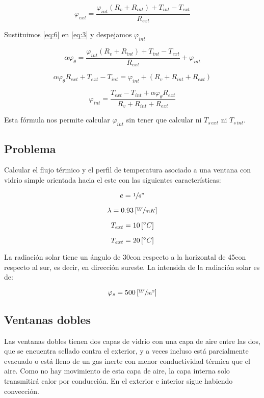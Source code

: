 \documentclass[12pt]{article}
\begin{document}
\begin{equation}\label{eq:6}
    \varphi _{ ext } = \frac{ \varphi _{ int } \left( R_v + R_{ int } \right) + T_{ int } - T_{ ext } }{ R_{ ext } }
\end{equation}

Sustituimos \ref{eq:6} en \ref{eq:3} y despejamos $ \varphi _{ int } $

\[ \alpha \varphi _\theta = \frac{ \varphi _{ int } \left( R_v + R_{ int } \right) + T_{ int } - T_{ ext } }{ R_{ ext } } + \varphi_{ int } \]

\[ \alpha \varphi _ \theta R_{ ext } + T_{ ext } - T_{ int } = \varphi _{ int } + \left( R_v + R_{ int } + R_{ ext } \right) \]

\[  \boxed{ \varphi _{ int } = \frac{ T_{ ext } - T_{ int } + \alpha \varphi _\theta R_{ ext } }{ R_v + R_{ int } + R_{ ext } } } \]

Esta fórmula nos permite calcular $ \varphi _{ int } $ sin tener que calcular ni $ T_{ s \, ext }  $ ni $ T_{ s \, int } $.

\subsection*{Problema}

Calcular el flujo térmico y el perfil de temperatura asociado a una ventana con vidrio simple orientada hacia el este con las siguientes características:

\[ e = \sfrac{1}{4}" \]

\[ \lambda = 0.93 \left[ \sfrac{ W }{ m K } \right] \]

\[ T_{ ext } = 10 \left[ \degree C \right] \]

\[ T_{ ext } = 20 \left[ \degree C \right] \]

La radiación solar tiene un ángulo de 30\degree con respecto a la horizontal de 45\degree con respecto al sur, es decir, en dirección sureste. La intensida de la radiación solar es de:

\[ \varphi _s = 500 \left[ \sfrac{ W }{ m ^2 } \right] \]

\subsection{Ventanas dobles}

Las ventanas dobles tienen dos capas de vidrio con una capa de aire entre las dos, que se encuentra sellado contra el exterior, y a veces incluso está parcialmente evacuado o está lleno de un gas inerte con menor conductividad térmica que el aire. Como no hay movimiento de esta capa de aire, la capa interna solo transmitirá calor por conducción. En el exterior e interior sigue habiendo convección.
\end{document}
